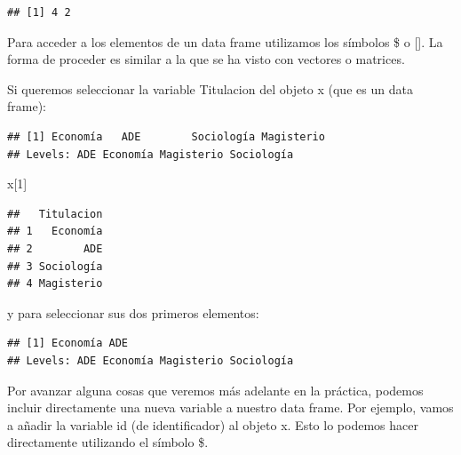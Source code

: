 \documentclass[
]{book}
\newenvironment{Shaded}{\begin{snugshade}}{\end{snugshade}}
\newcommand{\DecValTok}[1]{\textcolor[rgb]{0.00,0.00,0.81}{#1}}
\newcommand{\NormalTok}[1]{#1}
\newcommand{\SpecialCharTok}[1]{\textcolor[rgb]{0.00,0.00,0.00}{#1}}
\begin{document}
\begin{verbatim}
## [1] 4 2
\end{verbatim}

Para acceder a los elementos de un data frame utilizamos los símbolos \$ o {[}{]}. La forma de proceder es similar a la que se ha visto con vectores o matrices.

Si queremos seleccionar la variable Titulacion del objeto x (que es un data frame):

\begin{Shaded}
\end{Shaded}

\begin{verbatim}
## [1] Economía   ADE        Sociología Magisterio
## Levels: ADE Economía Magisterio Sociología
\end{verbatim}

\begin{Shaded}
\begin{Highlighting}[]
\NormalTok{x[}\DecValTok{1}\NormalTok{]}
\end{Highlighting}
\end{Shaded}

\begin{verbatim}
##   Titulacion
## 1   Economía
## 2        ADE
## 3 Sociología
## 4 Magisterio
\end{verbatim}

y para seleccionar sus dos primeros elementos:

\begin{Shaded}
\end{Shaded}

\begin{verbatim}
## [1] Economía ADE     
## Levels: ADE Economía Magisterio Sociología
\end{verbatim}

Por avanzar alguna cosas que veremos más adelante en la práctica, podemos incluir directamente una nueva variable a nuestro data frame. Por ejemplo, vamos a añadir la variable id (de identificador) al objeto x. Esto lo podemos hacer directamente utilizando el símbolo \$.
\end{document}

